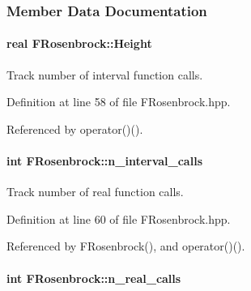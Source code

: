 \subsubsection{\-Member \-Data \-Documentation}
\hypertarget{classFRosenbrock_a2436ec0b9bb9efae5c029842ff6fd17e}{
\paragraph[{\-Height}]{\setlength{\rightskip}{0pt plus 5cm}real {\bf \-F\-Rosenbrock\-::\-Height}}}\label{classFRosenbrock_a2436ec0b9bb9efae5c029842ff6fd17e}


\-Track number of interval function calls. 



\-Definition at line 58 of file \-F\-Rosenbrock.\-hpp.



\-Referenced by operator()().

\hypertarget{classFRosenbrock_acedba3d3f792270d8b4f13a517b8d5d6}{
\paragraph[{n\-\_\-interval\-\_\-calls}]{\setlength{\rightskip}{0pt plus 5cm}int {\bf \-F\-Rosenbrock\-::n\-\_\-interval\-\_\-calls}}}\label{classFRosenbrock_acedba3d3f792270d8b4f13a517b8d5d6}


\-Track number of real function calls. 



\-Definition at line 60 of file \-F\-Rosenbrock.\-hpp.



\-Referenced by \-F\-Rosenbrock(), and operator()().

\hypertarget{classFRosenbrock_a65918b19b6ee08ea197bc021c2b6ea5e}{
\paragraph[{n\-\_\-real\-\_\-calls}]{\setlength{\rightskip}{0pt plus 5cm}int {\bf \-F\-Rosenbrock\-::n\-\_\-real\-\_\-calls}}}\label{classFRosenbrock_a65918b19b6ee08ea197bc021c2b6ea5e}


